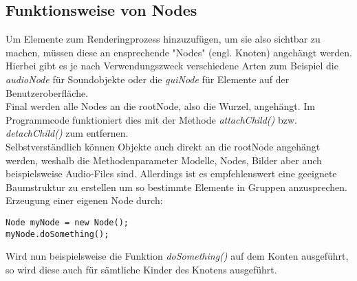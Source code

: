 \subsection{Funktionsweise von Nodes}
Um Elemente zum Renderingprozess hinzuzufügen, um sie also sichtbar zu machen, müssen diese an ensprechende "Nodes" (engl. Knoten) angehängt werden.
Hierbei gibt es je nach Verwendungszweck verschiedene Arten zum Beispiel die \emph{audioNode} für Soundobjekte oder die \emph{guiNode} für Elemente auf der Benutzeroberfläche.\\
Final werden alle Nodes an die rootNode, also die Wurzel, angehängt. Im  Programmcode funktioniert dies mit der Methode \emph{attachChild()} bzw. \emph{detachChild()} zum entfernen.\\
Selbstverständlich können Objekte auch direkt an die rootNode angehängt werden, weshalb die Methodenparameter Modelle, Nodes, Bilder aber auch beispielsweise Audio-Files sind.
Allerdings ist es empfehlenswert eine geeignete Baumstruktur zu erstellen um so bestimmte Elemente in Gruppen anzusprechen.\\ \underline{} Erzeugung einer eigenen Node durch:
\begin{lstlisting}
Node myNode = new Node();
myNode.doSomething();
\end{lstlisting}
Wird nun beispielsweise die Funktion \emph{doSomething()} auf dem Konten ausgeführt, so wird diese auch für sämtliche Kinder des Knotens ausgeführt.





